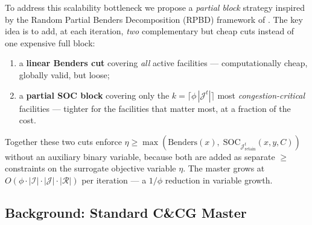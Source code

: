 To address this scalability bottleneck we propose a
\emph{partial block} strategy inspired by the Random Partial Benders
Decomposition (RPBD) framework of \citet{PauphiletWang2024}.
The key idea is to add, at each iteration, \emph{two} complementary
but cheap cuts instead of one expensive full block:
\begin{enumerate}
  \item a \textbf{linear Benders cut} covering \emph{all} active
        facilities — computationally cheap, globally valid, but loose;
  \item a \textbf{partial SOC block} covering only the
        $k = \lceil \phi\,|\mathcal{J}^{t}| \rceil$ most
        \emph{congestion-critical} facilities — tighter for the
        facilities that matter most, at a fraction of the cost.
\end{enumerate}
Together these two cuts enforce
$\eta \ge \max\!\left(
  \text{Benders}(x),\;
  \text{SOC}_{\mathcal{J}^{t}_{\mathrm{retain}}}(x,y,C)
\right)$
without an auxiliary binary variable, because both are added as
separate $\ge$ constraints on the surrogate objective variable $\eta$.
The master grows at $O(\phi \cdot |\mathcal{I}|\cdot|\mathcal{J}|\cdot|\mathcal{R}|)$
per iteration — a $1/\phi$ reduction in variable growth.

\subsection{Background: Standard C\&CG Master}
\label{sec:rpbd:standard}

